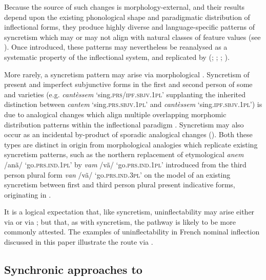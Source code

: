\documentclass[output=paper,colorlinks,citecolor=brown]{langscibook}
\begin{document}
Because the source of such changes is morphology-external, and their results depend upon the existing phonological shape and paradigmatic distribution of inflectional forms, they produce highly diverse and language-specific patterns of syncretism which may or may not align with natural classes of feature values (see \citealt{esher-syncretism-nodate}). Once introduced, these patterns may nevertheless be reanalysed as a systematic property of the inflectional system, and replicated by  (\citealt[10, 166--169]{baermanbrowncorbett2005}; \citealt{hansson2007}; \citealt[230]{baerman2008}; \citealt{hinzelin2011, hinzelin2012, hinzelin2022, esher2020}).

More rarely, a syncretism pattern may arise via morphological . Syncretism of present and imperfect subjunctive forms in the first and second person of some  and  varieties (e.g. \emph{cantèssem} `sing.\textsc{prs/ipf.sbjv.1pl}' supplanting the inherited distinction between \emph{cantem} `sing.\textsc{prs.sbjv.1pl}' and \emph{cantèssem} `sing.\textsc{ipf.sbjv.1pl}') is due to analogical changes which align multiple overlapping morphomic distribution patterns within the inflectional paradigm \citep{esher2022}. Syncretism may also occur as an incidental by-product of sporadic analogical changes (\citealt{esher2024, esher2025}). Both these types are distinct in origin from morphological analogies which replicate existing syncretism patterns, such as the northern  replacement of etymological \emph{anem} /anã/ `go.\textsc{prs.ind.1pl}' by \emph{vam} /vã/ `go.\textsc{prs.ind.1pl}' introduced from the third person plural form \emph{van} /vã/ `go.\textsc{prs.ind.3pl}' on the model of an existing syncretism between first and third person plural present indicative forms, originating in  \citep{esher2020}.

It is a logical expectation that, like syncretism, uninflectability may arise either via  or via ; but that, as with syncretism, the  pathway is likely to be more commonly attested. The examples of uninflectability in French nominal inflection discussed in this paper illustrate the route via .

\subsection{Synchronic approaches to }
\end{document}
